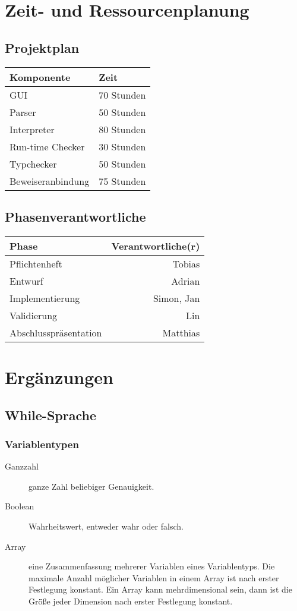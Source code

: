 \documentclass[a4paper,10pt]{article}
\begin{document}
\section{Zeit- und Ressourcenplanung}
\subsection{Projektplan}
\begin{tabular}[h]{| l | l |}
\hline
\textbf{Komponente} & \textbf{Zeit}\\
\hline
GUI & 70 Stunden\\
Parser & 50 Stunden\\
Interpreter & 80 Stunden\\
Run-time Checker & 30 Stunden\\
Typchecker & 50 Stunden\\
Beweiseranbindung & 75 Stunden\\
\hline
\end{tabular}
\subsection{Phasenverantwortliche}
\begin{tabular}[h]{| l | r |}
\hline
\textbf{Phase} & \textbf{Verantwortliche(r)}\\
\hline
Pflichtenheft & Tobias\\
\hline
Entwurf & Adrian\\
\hline
Implementierung & Simon, Jan\\
\hline
Validierung & Lin\\
\hline
Abschlusspr\"{a}sentation & Matthias\\
\hline
\end{tabular}


\section{Erg\"{a}nzungen}
\subsection{While-Sprache}
\subsubsection{Variablentypen}
\begin{description}
\item[Ganzzahl] ganze Zahl beliebiger Genauigkeit.
\item[Boolean] Wahrheitswert, entweder wahr oder falsch.
\item[Array] eine Zusammenfassung mehrerer Variablen eines Variablentyps. Die maximale Anzahl m\"{o}glicher Variablen in einem Array ist nach erster Festlegung konstant. Ein Array kann mehrdimensional sein, dann ist die Gr\"{ö}ße jeder Dimension nach erster Festlegung konstant.
\end{description}
\end{document}
